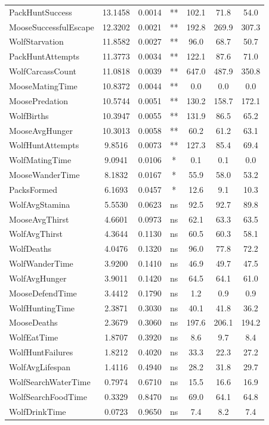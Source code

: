 \begin{longtable}[]{@{}lcccccc@{}}
PackHuntSuccess & 13.1458 & 0.0014 & ** & 102.1 & 71.8 & 54.0 \\
MooseSuccessfulEscape & 12.3202 & 0.0021 & ** & 192.8 & 269.9 & 307.3 \\
WolfStarvation & 11.8582 & 0.0027 & ** & 96.0 & 68.7 & 50.7 \\
PackHuntAttempts & 11.3773 & 0.0034 & ** & 122.1 & 87.6 & 71.0 \\
WolfCarcassCount & 11.0818 & 0.0039 & ** & 647.0 & 487.9 & 350.8 \\
MooseMatingTime & 10.8372 & 0.0044 & ** & 0.0 & 0.0 & 0.0 \\
MoosePredation & 10.5744 & 0.0051 & ** & 130.2 & 158.7 & 172.1 \\
WolfBirths & 10.3947 & 0.0055 & ** & 131.9 & 86.5 & 65.2 \\
MooseAvgHunger & 10.3013 & 0.0058 & ** & 60.2 & 61.2 & 63.1 \\
WolfHuntAttempts & 9.8516 & 0.0073 & ** & 127.3 & 85.4 & 69.4 \\
WolfMatingTime & 9.0941 & 0.0106 & * & 0.1 & 0.1 & 0.0 \\
MooseWanderTime & 8.1832 & 0.0167 & * & 55.9 & 58.0 & 53.2 \\
PacksFormed & 6.1693 & 0.0457 & * & 12.6 & 9.1 & 10.3 \\
WolfAvgStamina & 5.5530 & 0.0623 & ns & 92.5 & 92.7 & 89.8 \\
MooseAvgThirst & 4.6601 & 0.0973 & ns & 62.1 & 63.3 & 63.5 \\
WolfAvgThirst & 4.3644 & 0.1130 & ns & 60.5 & 60.3 & 58.1 \\
WolfDeaths & 4.0476 & 0.1320 & ns & 96.0 & 77.8 & 72.2 \\
WolfWanderTime & 3.9200 & 0.1410 & ns & 46.9 & 49.7 & 47.5 \\
WolfAvgHunger & 3.9011 & 0.1420 & ns & 64.5 & 64.1 & 61.0 \\
MooseDefendTime & 3.4412 & 0.1790 & ns & 1.2 & 0.9 & 0.9 \\
WolfHuntingTime & 2.3871 & 0.3030 & ns & 40.1 & 41.8 & 36.2 \\
MooseDeaths & 2.3679 & 0.3060 & ns & 197.6 & 206.1 & 194.2 \\
WolfEatTime & 1.8707 & 0.3920 & ns & 8.6 & 9.7 & 8.4 \\
WolfHuntFailures & 1.8212 & 0.4020 & ns & 33.3 & 22.3 & 27.2 \\
WolfAvgLifespan & 1.4116 & 0.4940 & ns & 28.2 & 31.8 & 29.7 \\
WolfSearchWaterTime & 0.7974 & 0.6710 & ns & 15.5 & 16.6 & 16.9 \\
WolfSearchFoodTime & 0.3329 & 0.8470 & ns & 69.0 & 64.1 & 64.8 \\
WolfDrinkTime & 0.0723 & 0.9650 & ns & 7.4 & 8.2 & 7.4 \\
\end{longtable} 